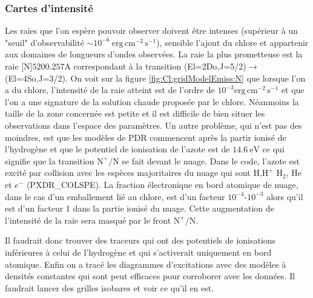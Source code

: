 \subsubsection{Cartes d'intensité}

Les raies que l'on espère pouvoir observer doivent être intenses (supérieur à un "seuil" d'observabilité $\sim 10^{-6} \ \mathrm{erg}\,\mathrm{cm}^{-2}\,\mathrm{s}^{-1}$), sensible l'ajout du chlore et appartenir aux domaines de longueurs d'ondes observées. La raie la plus prometteuse est la raie [N]$5200.257 \mathrm{A}$ correspondant à la transition (El=2Do,J=5/2)$\rightarrow$(El=4So,J=3/2). On voit sur la figure \ref{fig:Cl:gridModelEmiss:N} que lorsque l'on a du chlore, l'intensité de la raie atteint est de l'ordre de $10^{-3} \mathrm{erg}\,\mathrm{cm}^{-2}\,\mathrm{s}^{-1}$ et que l'on a une signature de la solution chaude proposée par le chlore. Néanmoins la taille de la zone concernée est petite et il est difficile de bien situer les observations dans l'espace des paramètres. Un autre problème, qui n'est pas des moindres, est que les modèles de PDR commencent après la partir ionisé de l'hydrogène et que le potentiel de ionisation de l'azote est de $14.6 \ \mathrm{eV}$ ce qui signifie que la transition $\mathrm{N}^+/\mathrm{N}$ se fait devant le nuage. Dans le code, l'azote est excité par collision avec les espèces majoritaires du nuage qui sont $\mathrm{H}$,$\mathrm{H}^+$ $\mathrm{H}_2$, $\mathrm{He}$ et $e^-$ (PXDR\_COLSPE). La fraction électronique en bord atomique de nuage, dans le cas d'un emballement lié au chlore, est d'un facteur $10^{-4}$-$10^{-3}$ alors qu'il est d'un facteur 1 dans la partie ionisé du nuage. Cette augmentation de l'intensité de la raie sera masqué par le front $\mathrm{N}^+/\mathrm{N}$. \newline

Il faudrait donc trouver des traceurs qui ont des potentiels de ionisations inférieures à celui de l'hydrogène et qui s'activerait uniquement en bord atomique. Enfin on a tracé les diagrammes d'excitations avec des modèles à densités constantes qui sont peut efficaces pour corroborer avec les données. Il faudrait lancer des grilles isobares et voir ce qu'il en est.


